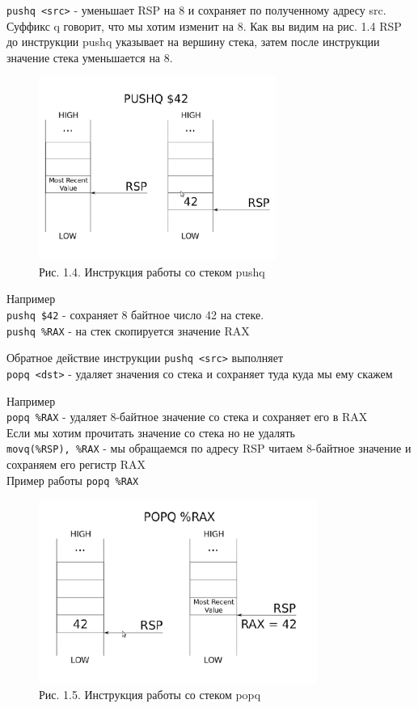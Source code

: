 	
	\par \texttt{pushq <src>} - уменьшает RSP на 8 и сохраняет по полученному адресу src. Суффикс q говорит, что мы хотим изменит на 8. Как вы видим на рис. 1.4 RSP до инструкции pushq указывает на вершину стека, затем после инструкции значение стека уменьшается на 8.
	
	\begin{figure}[h]
		\centering
		\includegraphics[height=6cm]{img/1.4} 
		\captionsetup{font=footnotesize} 
		\caption*{Рис. 1.4. Инструкция работы со стеком pushq} 
	\end{figure}
	
	\par Например 
	\\
	\texttt{pushq \$42} - сохраняет 8 байтное число 42 на стеке.
	\\
	\texttt{pushq \%RAX} - на стек скопируется значение RAX 
	
	\par Обратное действие инструкции \texttt{pushq <src>} выполняет 
	\\
	\texttt{popq <dst>} - удаляет значения со стека и сохраняет туда куда мы ему скажем 
	\par Например 
	\\
	\texttt{popq \%RAX} - удаляет 8-байтное значение со стека и сохраняет его в RAX
	\\
	Если мы хотим прочитать значение со стека но не удалять 
	\\
	\texttt{movq(\%RSP), \%RAX} - мы обращаемся по адресу RSP читаем 8-байтное значение и сохраняем его регистр RAX 
	\\
	Пример работы \texttt{popq \%RAX}
	
	\begin{figure}[h]
		\centering
		\includegraphics[height=6cm]{img/1.5} 
		\captionsetup{font=footnotesize} 
		\caption*{Рис. 1.5. Инструкция работы со стеком popq} 
	\end{figure}
	
